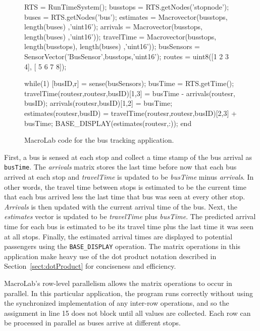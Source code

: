 \begin{figure}[ht]
  \begin{macrolab}
    RTS = RunTimeSystem();
    busstops = RTS.getNodes('stopnode'); 
    buses = RTS.getNodes('bus');
    estimates = Macrovector(busstops, length(buses) ,'uint16');
    arrivals = Macrovector(busstops, length(buses) ,'uint16'));
    travelTime = Macrovector(busstops, length(busstops), length(buses) ,'uint16'));
    busSensors = SensorVector('BusSensor',busstops,'uint16');
    routes = uint8({[1 2 3 4], [ 5 6 7 8]}); %

    while(1)
      [busID,r] =  sense(busSensors);
      busTime = RTS.getTime();
      travelTime(routes{r},routes{r},busID)[1,3] = busTime - arrivals(routes{r}, busID);
      arrivals(routes{r},busID)[1,2] = busTime;
      estimates(routes{r},busID) = travelTime(routes{r},routes{r},busID)[2,3] + busTime;
      BASE_DISPLAY(estimates(routes{r},:));
    end
  \end{macrolab}
  \caption[A bus tracking application in MacroLab]{MacroLab code for the bus
  tracking application.}
  \label{code:BusTracking}
\end{figure}

First, a bus is sensed at each stop and collect a time stamp of the bus arrival
as {\tt busTime}. The {\em arrivals} matrix stores the last time before now that
each bus arrived at each stop and \textit{travelTime} is updated to be
\textit{busTime} minus \textit{arrivals}. In other words, the travel time
between stops is estimated to be the current time that each bus arrived less the
last time that bus was seen at every other stop. \textit{Arrivals} is then
updated with the current arrival time of the bus. Next, the \textit{estimates}
vector is updated to be \textit{travelTime} plus \textit{busTime}. The predicted
arrival time for each bus is estimated to be its travel time plus the last time
it was seen at all stops. Finally, the estimated arrival times are displayed to
potential passengers using the {\tt BASE\_DISPLAY} operation.  The matrix
operations in this application make heavy use of the dot product notation
described in Section~\ref{sect:dotProduct} for conciseness and efficiency.

MacroLab's row-level parallelism allows the matrix operations to occur
in parallel.  In this particular application, the program runs
correctly without using the synchronized implementation of any
inter-row operations, and so the assignment in line 15 does not block
until all values are collected.  Each row can be processed in parallel
as buses arrive at different stops.

